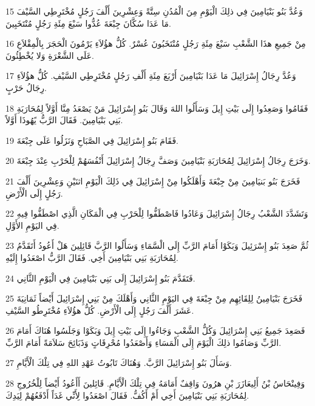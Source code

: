 \par 15 وَعُدَّ بَنُو بَنْيَامِينَ فِي ذلِكَ الْيَوْمِ مِنَ الْمُدُنِ سِتَّةً وَعِشْرِينَ أَلْفَ رَجُلٍ مُخْتَرِطِي السَّيْفَ مَا عَدَا سُكَّانَ جِبْعَةَ عُدُّوا سَبْعَ مِئَةِ رَجُلٍ مُنْتَخَبِينَ.
\par 16 مِنْ جَمِيعِ هذَا الشَّعْبِ سَبْعَ مِئَةِ رَجُلٍ مُنْتَخَبُونَ عُسْرٌ. كُلُّ هؤُلاَءِ يَرْمُونَ الْحَجَرَ بِالْمِقْلاَعِ عَلَى الشَّعْرَةِ وَلا يُخْطِئُونَ.
\par 17 وَعُدَّ رِجَالُ إِسْرَائِيلَ مَا عَدَا بَنْيَامِينَ أَرْبَعَ مِئَةِ أَلْفِ رَجُلٍ مُخْتَرِطِي السَّيْفِ. كُلُّ هؤُلاَءِ رِجَالُ حَرْبٍ.
\par 18 فَقَامُوا وَصَعِدُوا إِلَى بَيْتِ إِيلَ وَسَأَلُوا اللهَ وَقَالَ بَنُو إِسْرَائِيلَ مَنْ يَصْعَدُ مِنَّا أَوَّلاً لِمُحَارَبَةِ بَنِي بَنْيَامِينَ. فَقَالَ الرَّبُّ يًهُوذَا أَوَّلاً.
\par 19 فَقَامَ بَنُو إِسْرَائِيلَ فِي الصَّبَاحِ وَنَزَلُوا عَلَى جِبْعَةَ.
\par 20 وَخَرَجَ رِجَالُ إِسْرَائِيلَ لِمُحَارَبَةِ بَنْيَامِينَ وَصَفَّ رِجَالُ إِسْرَائِيلَ أَنْفُسَهُمْ لِلْحَرْبِ عِنْدَ جِبْعَةَ.
\par 21 فَخَرَجَ بَنُو بَنيَامِينَ مِنْ جِبْعَةَ وَأَهْلَكُوا مِنْ إِسْرَائِيلَ فِي ذَلِكَ الْيَوْمِ اثنَيْنِ وَعِشْرِينَ أَلْفَ رَجُلٍ إِلَى الْأَرْضِ.
\par 22 وَتَشَدَّدَ الشَّعْبُ رِجَالُ إِسْرَائِيلَ وَعَادُوا فَاصْطَفُّوا لِلْحَرْبِ فِي الْمَكَانِ الَّذِي اصْطَفُّوا فِيهِ فِي اليَوْمِ الأَوَّلِ.
\par 23 ثُمَّ صَعِدَ بَنُو إِسْرَئِيلَ وَبَكَوْا أَمَامَ الرَّبِّ إِلَى الْسَّمَاءِ وَسَأَلُوا الرَّبَّ قَائِلِينَ هَلْ أَعُودُ أَتَقَدَّمُ لِمُحَارَبَةِ بَنِي بَنْيَامِينَ أَخِي. فَقَالَ الرَّبُّ اصْعَدُوا إِلَيْهِ.
\par 24 فَتَقَدَّمَ بَنُو إِسْرَائِيلَ إِلَى بَنِي بَنْيَامِينَ فِي الْيَوْمِ الثَّانِي.
\par 25 فَخَرَجَ بَنْيَامِينُ لِلِقَائِهِم مِنْ جِبْعَةَ فِي اليَوْمِ الثَّانِي وَأَهْلَكَ مِنْ بَنِي إِسْرَائِيلَ أَيْضاً ثَمَانِيَةَ عَشَرَ أَلْفَ رَجُلٍ إِلَى الْأَرْضِ. كُلُّ هؤُلاَءِ مُخْتَرِطُو السَّيْفِ.
\par 26 فَصَعِدَ جَمِيعُ بَنِي إِسْرَائِيلَ وَكُلُّ الشَّعْبِ وَجَاءُوا إِلَى بَيْتِ إِيلَ وَبَكَوْا وَجَلَسُوا هُنَاكَ أَمَامَ الرَّبِّ وَصَامُوا ذلِكَ الْيَوْمَ إِلَى الْمَسَاءِ وَأَصْعَدُوا مُحْرِقَاتٍ وَذَبَائِحَ سَلاَمَةً أَمَامَ الرَّبِّ.
\par 27 وَسَأَلَ بَنُو إِسْرَائِيلَ الرَّبَّ. وَهُنَاكَ تَابُوتُ عَهْدِ اللهِ فِي تِلْكَ الْأَيَّامِ.
\par 28 وَفِينْحَاسُ بْنُ أَلِيعَازَرَ بْنِ هرُونَ وَاقِفٌ أَمَامَهُ فِي تِلْكَ الْأَيَّامِ. قَائِلينَ أَأَعُودُ أَيْضاً لِلْخُرُوجِ لِمُحَارَبَةِ بَنِي بَنْيَامِينَ أَخِي أَمْ أَكُفُّ. فَقَالَ اصْعَدُوا لِأَنِّي غَدَاً أَدْفَعُهُمْ لِيَدِكَ.
